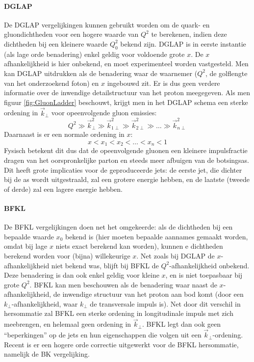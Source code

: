 \documentclass[a4paper,11pt]{article}
\numberwithin{equation}{section} %
\begin{document}
      \paragraph{DGLAP} \label{sec:DGLAP}
De DGLAP vergelijkingen kunnen gebruikt worden om de quark- en gluondichtheden voor een hogere waarde van $Q^2$ te berekenen, indien deze dichtheden bij een kleinere waarde $Q_0^2$ bekend zijn.
DGLAP is in eerste instantie (als lage orde benadering) enkel geldig voor voldoende grote $x$.
De $x$ afhankelijkheid is hier onbekend, en moet experimenteel worden vastgesteld.
Men kan DGLAP uitdrukken als de benadering waar de waarnemer ($Q^2$, de golflengte van het onderzoekend foton) en $x$ ingebouwd zit.
Er is dus geen verdere informatie over de inwendige detailstructuur van het proton meegegeven.
Als men figuur \ref{fig:GluonLadder} beschouwt, krijgt men in het DGLAP schema een sterke ordening in $\vec{k}_\perp$ voor opeenvolgende gluon emissies:
\begin{equation}
Q^2 \gg \vec{k}_\perp^2 \gg \vec{k}_{1\perp}^2 \gg \vec{k}_{2\perp}^2 \gg \hdots \gg \vec{k}_{n\perp}^2
\end{equation}
Daarnaast is er een normale ordening in $x$:
\begin{equation}
x < x_1 < x_2 < \hdots < x_n < 1
\end{equation}
Fysisch betekent dit dus dat de opeenvolgende gluonen een kleinere impulsfractie dragen van het oorspronkelijke parton en steeds meer afbuigen van de botsingsas.
Dit heeft grote implicaties voor de geproduceerde jets: de eerste jet, die dichter bij de as wordt uitgestraald, zal een grotere energie hebben, en de laatste (tweede of derde) zal een lagere energie hebben.

      \paragraph{BFKL}
De BFKL vergelijkingen doen net het omgekeerde: als de dichtheden bij een bepaalde waarde $x_0$ bekend is (hier moeten bepaalde aannames gemaakt worden, omdat bij lage $x$ niets exact berekend kan worden), kunnen e dichtheden berekend worden voor (bijna) willekeurige $x$.
Net zoals bij DGLAP de $x$-afhankelijkheid niet bekend was, blijft bij BFKL de $Q^2$-afhankelijkheid onbekend.
Deze benadering is dan ook enkel geldig voor kleine $x$, en is niet toepasbaar bij grote $Q^2$.
BFKL kan men beschouwen als de benadering waar naast de $x$-afhankelijkheid, de inwendige structuur van het proton aan bod komt (door een $k_\perp$-afhankelijkheid, waar $k_\perp$ de transversale impuls is).
Net door dit verschil in hersommatie zal BFKL een sterke ordening in longitudinale impuls met zich meebrengen, en helemaal geen ordening in $\vec{k}_\perp$.
BFKL legt dan ook geen “beperkingen” op de jets en hun eigenschappen die volgen uit een $\vec{k}_\perp$-ordening.
Recent is er een hogere orde correctie uitgewerkt voor de BFKL hersommatie, namelijk de BK vergelijking.
\end{document}

